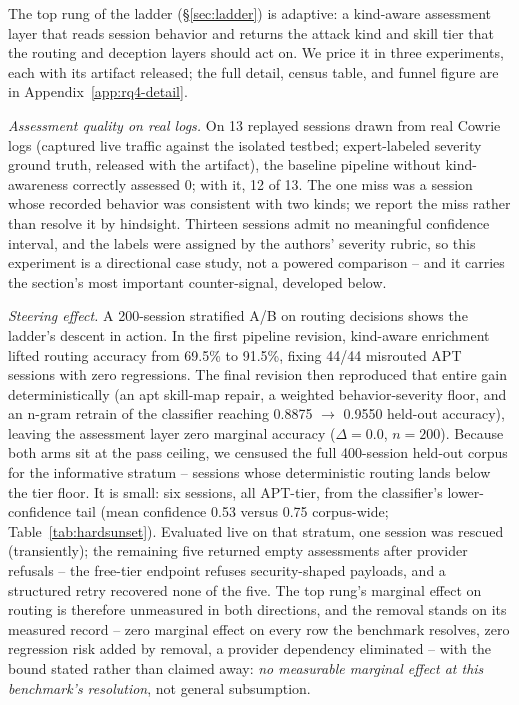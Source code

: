 The top rung of the ladder (\S\ref{sec:ladder}) is adaptive: a
kind-aware assessment layer that reads session behavior and returns the
attack kind and skill tier that the routing and deception layers should
act on. We price it in three experiments, each with its artifact
released; the full detail, census table, and funnel figure are in
Appendix~\ref{app:rq4-detail}.

\emph{Assessment quality on real logs.} On 13 replayed sessions drawn
from real Cowrie logs (captured live traffic against the isolated
testbed; expert-labeled severity ground truth, released with the
artifact), the baseline pipeline without kind-awareness correctly
assessed 0; with it, 12 of 13. The one miss was a session whose recorded
behavior was consistent with two kinds; we report the miss rather than
resolve it by hindsight. Thirteen sessions admit no meaningful
confidence interval, and the labels were assigned by the authors'
severity rubric, so this experiment is a directional case study, not a
powered comparison -- and it carries the section's most important
counter-signal, developed below.

\emph{Steering effect.} A 200-session stratified A/B on routing decisions
shows the ladder's descent in action. In the first pipeline revision,
kind-aware enrichment lifted routing accuracy from 69.5\% to 91.5\%,
fixing 44/44 misrouted APT sessions with zero regressions. The final
revision then reproduced that entire gain deterministically (an apt
skill-map repair, a weighted behavior-severity floor, and an n-gram
retrain of the classifier reaching 0.8875 $\to$ 0.9550 held-out
accuracy), leaving the assessment layer zero marginal accuracy
($\Delta = 0.0$, $n=200$). Because both arms sit at the pass ceiling,
we censused the full 400-session held-out corpus for the informative
stratum -- sessions whose deterministic routing lands below the tier
floor. It is small: six sessions, all APT-tier, from the classifier's
lower-confidence tail (mean confidence 0.53 versus 0.75 corpus-wide;
Table~\ref{tab:hardsunset}). Evaluated live on that stratum, one session
was rescued (transiently); the remaining five returned empty assessments
after provider refusals -- the free-tier endpoint refuses
security-shaped payloads, and a structured retry recovered none of the
five. The top rung's marginal effect on routing is therefore unmeasured
in both directions, and the removal stands on its measured record --
zero marginal effect on every row the benchmark resolves, zero
regression risk added by removal, a provider dependency eliminated --
with the bound stated rather than claimed away: \emph{no measurable
marginal effect at this benchmark's resolution}, not general subsumption.

